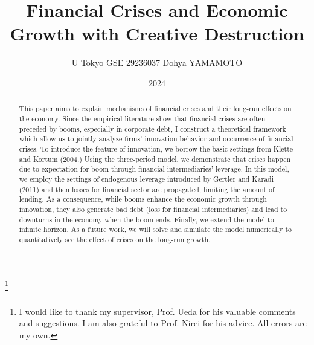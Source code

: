 \documentclass[a4paper,12pt]{article}
\title{Financial Crises and Economic Growth with Creative Destruction}
\author{U Tokyo GSE 29236037 Dohya YAMAMOTO}
\date{2024}
\begin{document}
\maketitle
\footnote{I would like to thank my supervisor, Prof. Ueda for his valuable comments and suggestions. I am also grateful to Prof. Nirei for his advice. All errors are my own.}

\begin{abstract}
    This paper aims to explain mechanisms of financial crises and their long-run effects on the economy. Since the empirical literature show that financial crises are often preceded by booms, especially in corporate debt, I construct a theoretical framework which allow us to jointly analyze firms' innovation behavior and occurrence of financial crises. To introduce the feature of innovation, we borrow the basic settings from Klette and Kortum (2004.) Using the three-period model, we demonstrate that crises happen due to expectation for boom through financial intermediaries' leverage. In this model, we employ the settings of endogenous leverage introduced by Gertler and Karadi (2011) and then losses for financial sector are propagated, limiting the amount of lending. As a consequence, while booms enhance the economic growth through innovation, they also generate bad debt (loss for financial intermediaries) and lead to downturns in the economy when the boom ends. Finally, we extend the model to infinite horizon. As a future work, we will solve and simulate the model numerically to quantitatively see the effect of crises on the long-run growth.
\end{abstract}
\end{document}
